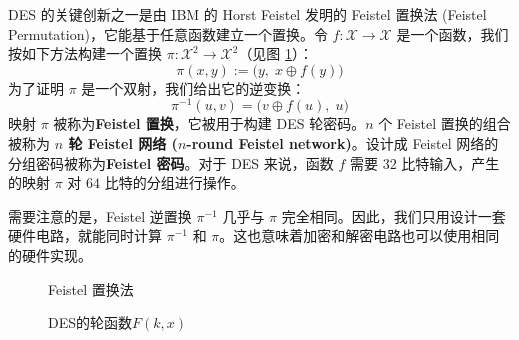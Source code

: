 \begin{snote}
DES 的关键创新之一是由 IBM 的 Horst Feistel 发明的 Feistel 置换法 (Feistel Permutation)，它能基于任意函数建立一个置换。令 $f:\mathcal{X}\to\mathcal{X}$ 是一个函数，我们按如下方法构建一个置换 $\pi:\mathcal{X}^2\to\mathcal{X}^2$（见图 \ref{fig:4-7}）：
\[
\pi(x,y)
:=
\big(
y,\;x\oplus f(y)
\big)
\]
为了证明 $\pi$ 是一个双射，我们给出它的逆变换：
\[
\pi^{-1}(u,v)
=
\big(
v\oplus f(u),\;u
\big)
\]
映射 $\pi$ 被称为\textbf{Feistel 置换}，它被用于构建 DES 轮密码。$n$ 个 Feistel 置换的组合被称为 \textbf{$n$ 轮 Feistel 网络 ($n$-round Feistel network)}。设计成 Feistel 网络的分组密码被称为\textbf{Feistel 密码}。对于 DES 来说，函数 $f$ 需要 $32$ 比特输入，产生的映射 $\pi$ 对 $64$ 比特的分组进行操作。

需要注意的是，Feistel 逆置换 $\pi^{-1}$ 几乎与 $\pi$ 完全相同。因此，我们只用设计一套硬件电路，就能同时计算 $\pi^{-1}$ 和 $\pi$。这也意味着加密和解密电路也可以使用相同的硬件实现。
\end{snote}

\begin{figure}
  \centering
  
  \caption{Feistel 置换法}
  \label{fig:4-7}
\end{figure}

\begin{figure}[p!]
  \centering
  
  \caption{DES的轮函数$F(k,x)$}
  \label{fig:4-8}
\end{figure}

